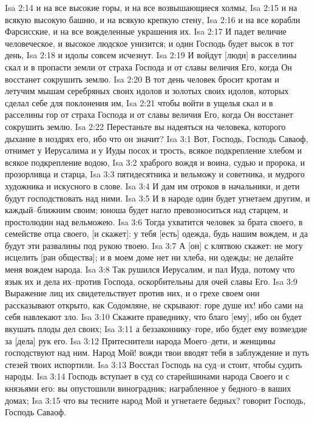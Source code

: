 Isa 2:14  и на все высокие горы, и на все возвышающиеся холмы,
Isa 2:15  и на всякую высокую башню, и на всякую крепкую стену,
Isa 2:16  и на все корабли Фарсисские, и на все вожделенные украшения их.
Isa 2:17  И падет величие человеческое, и высокое людское унизится; и один Господь будет высок в тот день,
Isa 2:18  и идолы совсем исчезнут.
Isa 2:19  И войдут [люди] в расселины скал и в пропасти земли от страха Господа и от славы величия Его, когда Он восстанет сокрушить землю.
Isa 2:20  В тот день человек бросит кротам и летучим мышам серебряных своих идолов и золотых своих идолов, которых сделал себе для поклонения им,
Isa 2:21  чтобы войти в ущелья скал и в расселины гор от страха Господа и от славы величия Его, когда Он восстанет сокрушить землю.
Isa 2:22  Перестаньте вы надеяться на человека, которого дыхание в ноздрях его, ибо что он значит?
Isa 3:1  Вот, Господь, Господь Саваоф, отнимет у Иерусалима и у Иуды посох и трость, всякое подкрепление хлебом и всякое подкрепление водою,
Isa 3:2  храброго вождя и воина, судью и пророка, и прозорливца и старца,
Isa 3:3  пятидесятника и вельможу и советника, и мудрого художника и искусного в слове.
Isa 3:4  И дам им отроков в начальники, и дети будут господствовать над ними.
Isa 3:5  И в народе один будет угнетаем другим, и каждый--ближним своим; юноша будет нагло превозноситься над старцем, и простолюдин над вельможею.
Isa 3:6  Тогда ухватится человек за брата своего, в семействе отца своего, [и скажет]: у тебя [есть] одежда, будь нашим вождем, и да будут эти развалины под рукою твоею.
Isa 3:7  А [он] с клятвою скажет: не могу исцелить [ран общества]; и в моем доме нет ни хлеба, ни одежды; не делайте меня вождем народа.
Isa 3:8  Так рушился Иерусалим, и пал Иуда, потому что язык их и дела их--против Господа, оскорбительны для очей славы Его.
Isa 3:9  Выражение лиц их свидетельствует против них, и о грехе своем они рассказывают открыто, как Содомляне, не скрывают: горе душе их! ибо сами на себя навлекают зло.
Isa 3:10  Скажите праведнику, что благо [ему], ибо он будет вкушать плоды дел своих;
Isa 3:11  а беззаконнику--горе, ибо будет ему возмездие за [дела] рук его.
Isa 3:12  Притеснители народа Моего--дети, и женщины господствуют над ним. Народ Мой! вожди твои вводят тебя в заблуждение и путь стезей твоих испортили.
Isa 3:13  Восстал Господь на суд--и стоит, чтобы судить народы.
Isa 3:14  Господь вступает в суд со старейшинами народа Своего и с князьями его: вы опустошили виноградник; награбленное у бедного--в ваших домах;
Isa 3:15  что вы тесните народ Мой и угнетаете бедных? говорит Господь, Господь Саваоф.
